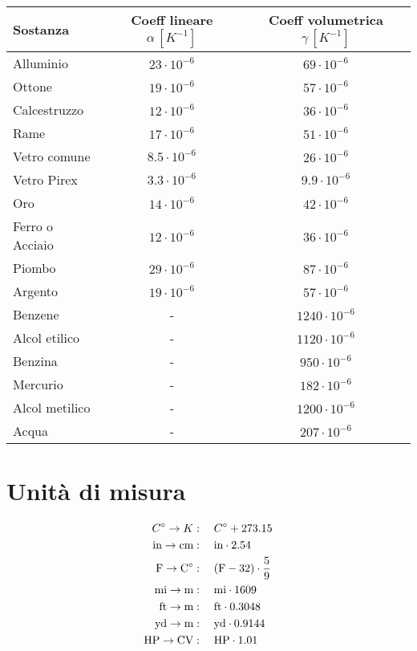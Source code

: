\documentclass[a4paper]{article}
\newcommand{\cel}{C\degree}
\begin{document}
\begin{tabular}{ l | c | c }
    \hline
    \textbf{Sostanza} & \textbf{Coeff lineare \(\alpha\,[K^{-1}]\)} & \textbf{Coeff volumetrica \(\gamma\,[K^{-1}]\)} \\
    \hline
    Alluminio & \(23 \cdot 10^{-6}\) & \(69 \cdot 10^{-6}\) \\
    Ottone & \(19 \cdot 10^{-6}\) & \(57 \cdot 10^{-6}\) \\
    Calcestruzzo & \(12 \cdot 10^{-6}\) & \(36 \cdot 10^{-6}\) \\
    Rame & \(17 \cdot 10^{-6}\) & \(51 \cdot 10^{-6}\) \\
    Vetro comune & 8.\(5 \cdot 10^{-6}\) & \(26 \cdot 10^{-6}\) \\
    Vetro Pirex & 3.\(3 \cdot 10^{-6}\) & 9.\(9 \cdot 10^{-6}\) \\
    Oro & \(14 \cdot 10^{-6}\) & \(42 \cdot 10^{-6}\) \\
    Ferro o Acciaio & \(12 \cdot 10^{-6}\) & \(36 \cdot 10^{-6}\) \\
    Piombo & \(29 \cdot 10^{-6}\) & \(87 \cdot 10^{-6}\) \\
    Argento & \(19 \cdot 10^{-6}\) & \(57 \cdot 10^{-6}\) \\
    Benzene & - & \(1240 \cdot 10^{-6}\) \\
    Alcol etilico & - & \(1120 \cdot 10^{-6}\) \\
    Benzina & - & \(950 \cdot 10^{-6}\) \\
    Mercurio & - & \(182 \cdot 10^{-6}\) \\
    Alcol metilico & - & \(1200 \cdot 10^{-6}\) \\
    Acqua & - & \(207 \cdot 10^{-6}\) \\
    \hline  
\end{tabular}

\section{Unità di misura}

\begin{align*}
    \cel \to K&: \quad \cel+273.15 \\
    \text{in} \to \text{cm}&: \quad \text{in} \cdot 2.54 \\
    \text{F} \to \text{\cel}&: \quad (\text{F} - 32) \cdot \frac{5}{9} \\
    \text{mi} \to \text{m}&: \quad \text{mi} \cdot 1609 \\
    \text{ft} \to \text{m}&: \quad \text{ft} \cdot 0.3048 \\
    \text{yd} \to \text{m}&: \quad \text{yd} \cdot 0.9144 \\
    \text{HP} \to \text{CV}&: \quad \text{HP} \cdot 1.01 \\
\end{align*}
\end{document}
